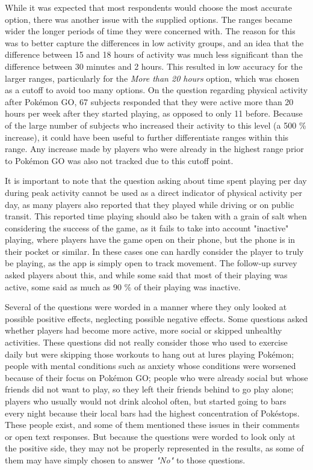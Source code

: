 While it was expected that most respondents would choose the most accurate option, there was another issue with the supplied options. The ranges became wider the longer periods of time they were concerned with. The reason for this was to better capture the differences in low activity groups, and an idea that the difference between 15 and 18 hours of activity was much less significant than the difference between 30 minutes and 2 hours. This resulted in low accuracy for the larger ranges, particularly for the \emph{More than 20 hours} option, which was chosen as a cutoff to avoid too many options. On the question regarding physical activity after Pokémon GO, 67 subjects responded that they were active more than 20 hours per week after they started playing, as opposed to only 11 before. Because of the large number of subjects who increased their activity to this level (a 500 \% increase), it could have been useful to further differentiate ranges within this range. Any increase made by players who were already in the highest range prior to Pokémon GO was also not tracked due to this cutoff point.

It is important to note that the question asking about time spent playing per day during peak activity cannot be used as a direct indicator of physical activity per day, as many players also reported that they played while driving or on public transit. This reported time playing should also be taken with a grain of salt when considering the success of the game, as it fails to take into account "inactive" playing, where players have the game open on their phone, but the phone is in their pocket or similar. In these cases one can hardly consider the player to truly be playing, as the app is simply open to track movement. The follow-up survey asked players about this, and while some said that most of their playing was active, some said as much as 90 \% of their playing was inactive.

Several of the questions were worded in a manner where they only looked at possible positive effects, neglecting possible negative effects. Some questions asked whether players had become more active, more social or skipped unhealthy activities. These questions did not really consider those who used to exercise daily but were skipping those workouts to hang out at lures playing Pokémon; people with mental conditions such as anxiety whose conditions were worsened because of their focus on Pokémon GO; people who were already social but whose friends did not want to play, so they left their friends behind to go play alone; players who usually would not drink alcohol often, but started going to bars every night because their local bars had the highest concentration of Pokéstops. These people exist, and some of them mentioned these issues in their comments or open text responses. But because the questions were worded to look only at the positive side, they may not be properly represented in the results, as some of them may have simply chosen to answer \emph{"No"} to those questions.

